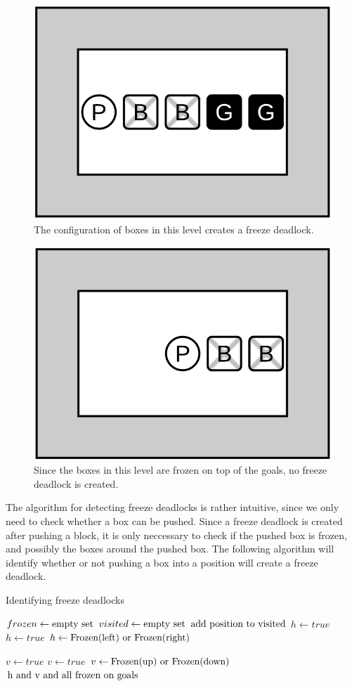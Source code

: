 \documentclass[times, 10pt,twocolumn]{article}
\begin{document}
\begin{figure}[h] 
  \centering
     \includegraphics[width=0.5\linewidth]{images/freeze_deadlock.png}
  \caption{The configuration of boxes in this level creates a freeze deadlock.}
  \label{fig:f}
\end{figure}

\begin{figure}[h] 
  \centering
     \includegraphics[width=0.5\linewidth]{images/freeze_deadlock_ok.png}
  \caption{Since the boxes in this level are frozen on top of the goals, no freeze deadlock is created.}
  \label{fig:fok}
\end{figure}

The algorithm for detecting freeze deadlocks is rather intuitive, since we only need to check whether a box can be pushed. Since a freeze deadlock is created after pushing a block, it is only neccessary to check if the pushed box is frozen, and possibly the boxes around the pushed box. The following algorithm will identify whether or not pushing a box into a position will create a freeze deadlock. \cite{Wiki}

\begin{algorithm}
  \caption{Identifying freeze deadlocks}
\begin{algorithmic}[1]
  \State $frozen \gets \textnormal{empty set}$
  \State $visited \gets \textnormal{empty set}$
    \State $\textnormal{add position to visited}$
      \State $h\gets true$
      \State $h\gets true$
      \State $h\gets \textnormal{Frozen(left) or Frozen(right)}$
    \EndIf

      \State $v\gets true$
      \State $v\gets true$
      \State $v\gets \textnormal{Frozen(up) or Frozen(down)}$
    \EndIf
    \State \Return $\textnormal{h and v and all frozen on goals}$
  \EndFunction
  \end{algorithmic}
\end{algorithm}
\end{document}

